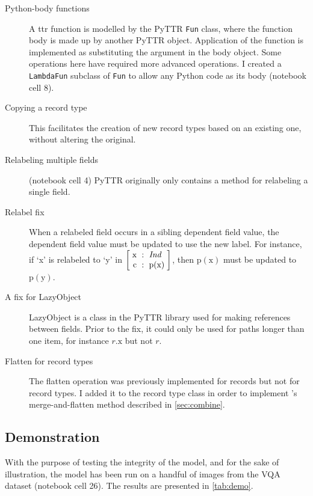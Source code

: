 \begin{description}
\item[Python-body functions] A \gls{ttr} function is modelled by the PyTTR \texttt{Fun} class, where the function body is made up by another PyTTR object.
Application of the function is implemented as substituting the argument in the body object.
Some operations here have required more advanced operations.
I created a \texttt{LambdaFun} subclass of \texttt{Fun} to allow any Python code as its body (notebook cell 8).
\item[Copying a record type] This facilitates the creation of new record types based on an existing one, without altering the original.
\item[Relabeling multiple fields] (notebook cell 4) PyTTR originally only contains a method for relabeling a single field.
\item[Relabel fix] When a relabeled field occurs in a sibling dependent field value, the dependent field value must be updated to use the new label.
	For instance, if `x' is relabeled to `y' in $\rec{\text{x} &:& \type{Ind} \\ \text{c} &:& \text{p}(\text{x})}$, then $\text{p}(\text{x})$ must be updated to $\text{p}(\text{y})$.
\item[A fix for LazyObject] LazyObject is a class in the PyTTR library used for making references between fields.
Prior to the fix, it could only be used for paths longer than one item, for instance $r.\text{x}$ but not $r$.
\item[Flatten for record types] The flatten operation was previously implemented for records but not for record types.
I added it to the record type class in order to implement \citeauthor{CooperTypetheorylanguage2016}'s merge-and-flatten method described in \autoref{sec:combine}.
\end{description}



\subsection{Demonstration}

With the purpose of testing the integrity of the model, and for the sake of illustration, the model has been run on a handful of images from the VQA dataset \citep{AgrawalVQAVisualQuestion2015} (notebook cell 26).
The results are presented in \autoref{tab:demo}.

